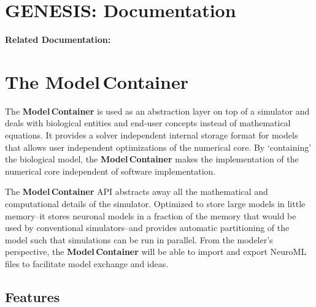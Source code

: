 \documentclass[12pt]{article}
\begin{document}
\section*{GENESIS: Documentation}

{\bf Related Documentation:}

\section*{The Model\,Container}

The {\bf Model\,Container} is used as an abstraction layer on top of a simulator and deals with biological entities and end-user concepts instead of mathematical equations. It provides a solver independent internal storage format for models that allows user independent optimizations of the numerical core. By `containing' the biological model, the {\bf Model\,Container} makes the implementation of the numerical core independent of software implementation.

The {\bf Model\,Container} API abstracts away all the mathematical and computational details of the simulator. Optimized to store large models in little memory--it stores neuronal models in a fraction of the memory that would be used by conventional simulators--and provides automatic partitioning of the model such that simulations can be run in parallel. From the modeler's perspective, the {\bf Model\,Container} will be able to import and export NeuroML files to facilitate model exchange and ideas.

\subsection*{Features}
\end{document}
